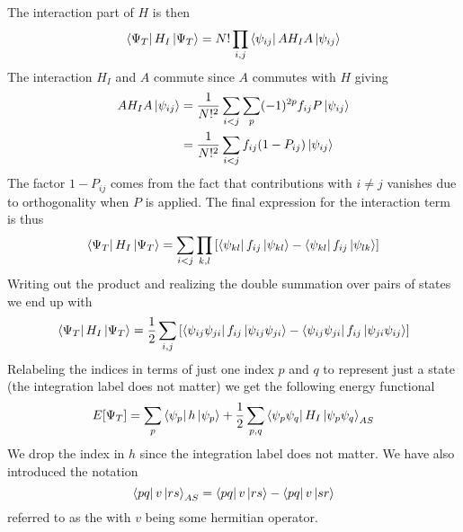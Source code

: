         The interaction part of $H$ is then
            \begin{equation}
                \bra{\Psi_T}H_I\ket{\Psi_T} = N!\prod_{i,j}\bra{\psi_{ij}}AH_IA\ket{\psi_{ij}}
            \end{equation}
        The interaction $H_I$ and $A$ commute since $A$ commutes with $H$
        giving
            \begin{align}
                AH_IA\ket{\psi_{ij}} &= \frac{1}{N!^2}\sum_{i<j}\sum_{p}
                (-1)^{2p}f_{ij} P\ket{\psi_{ij}} \\
                &= \frac{1}{N!^2}\sum_{i<j}f_{ij}(1-P_{ij})\ket{\psi_{ij}}
            \end{align}
        The factor $1-P_{ij}$ comes from the fact that contributions with
        $i\neq j$ vanishes due to orthogonality when $P$ is applied. The final
        expression for the interaction term is thus
            \begin{equation}
                \bra{\Psi_T}H_I\ket{\Psi_T} =
                \sum_{i<j}\prod_{k,l}\left[\bra{\psi_{kl}}f_{ij}\ket{\psi_{kl}} -
                \bra{\psi_{kl}}f_{ij}\ket{\psi_{lk}}\right]
            \end{equation}
        Writing out the product and realizing the double summation over pairs
        of states we end up with
            \begin{equation}
                \bra{\Psi_T}H_I\ket{\Psi_T} = \frac{1}{2}
                \sum_{i,j}\left[\bra{\psi_{ij}\psi_{ji}}f_{ij}\ket{\psi_{ij}\psi_{ji}} -
                \bra{\psi_{ij}\psi_{ji}}f_{ij}\ket{\psi_{ji}\psi_{ij}}\right]
            \end{equation}
        Relabeling the indices in terms of just one index $p$ and $q$ to
        represent just a state (the integration label does not matter) we get
        the following energy functional
            \begin{equation}
                E[\Psi_T] = \sum_p\bra{\psi_p}h\ket{\psi_p} +
                \frac{1}{2}\sum_{p,q}
                \bra{\psi_p\psi_q}H_I\ket{\psi_p\psi_q}_{AS}
                \label{eq:EfuncFinal}
            \end{equation}
        We drop the index in $h$ since the integration label does not matter.
        We have also introduced the notation
            \begin{equation}
                \bra{pq}v\ket{rs}_{AS} = \bra{pq}v\ket{rs} - \bra{pq}v\ket{sr}
            \end{equation}
        referred to as the  with $v$ being some
        hermitian operator.

